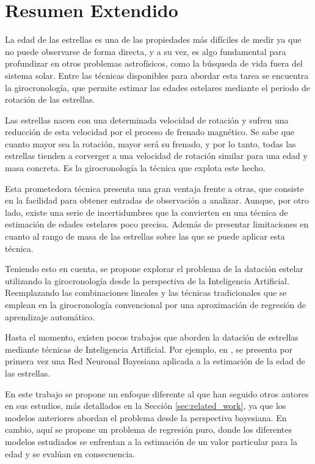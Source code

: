 \chapter{Resumen Extendido}

La edad de las estrellas es una de las propiedades más difíciles de medir ya que no puede observarse de forma directa, y a su vez, es algo fundamental para profundizar en otros problemas astrofísicos, como la búsqueda de vida fuera del sistema solar. Entre las técnicas disponibles para abordar esta tarea se encuentra la girocronología, que permite estimar las edades estelares mediante el periodo de rotación de las estrellas.

Las estrellas nacen con una determinada velocidad de rotación y sufren una reducción de esta velocidad por el proceso de frenado magnético. Se sabe que cuanto mayor sea la rotación, mayor será su frenado, y por lo tanto, todas las estrellas tienden a corverger a una velocidad de rotación similar para una edad y masa concreta. Es la girocronología la técnica que explota este hecho.

Esta prometedora técnica presenta una gran ventaja frente a otras, que consiste en la facilidad para obtener entradas de observación a analizar. Aunque, por otro lado, existe una serie de incertidumbres que la convierten en una técnica de estimación de edades estelares poco precisa. Además de presentar limitaciones en cuanto al rango de masa de las estrellas sobre las que se puede aplicar esta técnica.

\vspace{0.5cm}

Teniendo esto en cuenta, se propone explorar el problema de la datación estelar utilizando la girocronología desde la perspectiva de la Inteligencia Artificial. Reemplazando las combinaciones lineales y las técnicas tradicionales que se emplean en la girocronología convencional por una aproximación de regresión de aprendizaje automático.

Hasta el momento, existen pocos trabajos que aborden la datación de estrellas mediante técnicas de Inteligencia Artificial. Por ejemplo, en \cite{sanders2018}, se presenta por primera vez una Red Neuronal Bayesiana aplicada a la estimación de la edad de las estrellas. 

En este trabajo se propone un enfoque diferente al que han seguido otros autores en sus estudios, más detallados en la Sección \ref{sec:related_work}, ya que los modelos anteriores abordan el problema desde la perspectiva bayesiana. En cambio, aquí se propone un problema de regresión puro, donde los diferentes modelos estudiados se enfrentan a la estimación de un valor particular para la edad y se evalúan en consecuencia.

